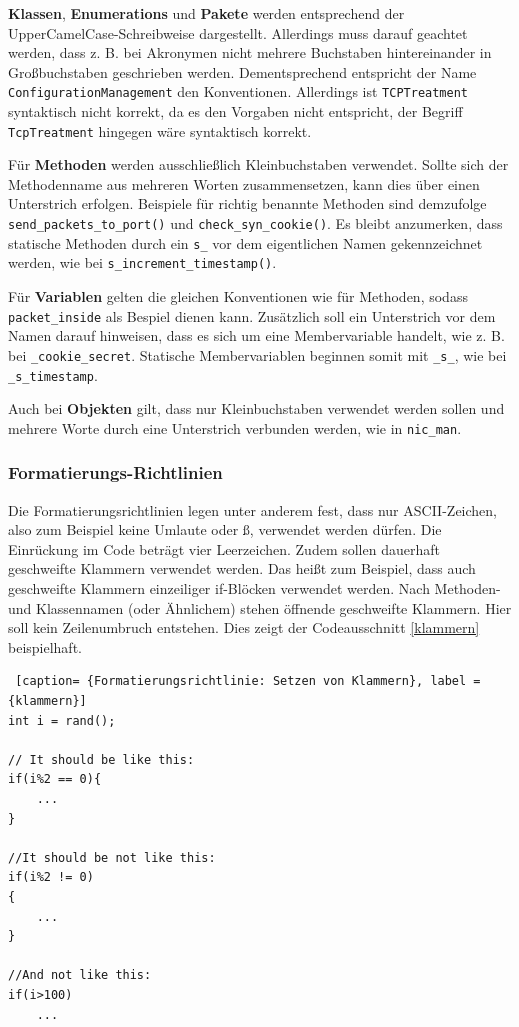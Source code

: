 \documentclass[../review_3.tex]{subfiles}
\begin{document}
\textbf{Klassen}, \textbf{Enumerations} und \textbf{Pakete} werden entsprechend der UpperCamelCase-Schreibweise dargestellt. Allerdings muss darauf geachtet werden, dass z. B. bei Akronymen nicht mehrere Buchstaben hintereinander in Großbuchstaben geschrieben werden.
Dementsprechend entspricht der Name \texttt{ConfigurationManagement} den Konventionen. Allerdings ist \texttt{TCPTreatment} syntaktisch nicht korrekt, da es den Vorgaben nicht entspricht, der Begriff \texttt{TcpTreatment} hingegen wäre syntaktisch korrekt.

Für \textbf{Methoden} werden ausschließlich Kleinbuchstaben verwendet. Sollte sich der Methodenname aus mehreren Worten zusammensetzen, kann dies über einen Unterstrich erfolgen. Beispiele für richtig benannte Methoden sind demzufolge \texttt{send\_packets\_to\_port()} und \texttt{check\_syn\_cookie()}. Es bleibt anzumerken, dass statische Methoden durch ein \texttt{s\_} vor dem eigentlichen Namen gekennzeichnet werden, wie bei \texttt{s\_increment\_timestamp()}.

Für \textbf{Variablen} gelten die gleichen Konventionen wie für Methoden, sodass \texttt{packet\_inside} als Bespiel dienen kann. Zusätzlich soll ein Unterstrich vor dem Namen darauf hinweisen, dass es sich um eine Membervariable handelt, wie z. B. bei \texttt{\_cookie\_secret}. Statische Membervariablen beginnen somit mit \texttt{\_s\_}, wie bei \texttt{\_s\_timestamp}.

Auch bei \textbf{Objekten} gilt, dass nur Kleinbuchstaben verwendet werden sollen und mehrere Worte durch eine Unterstrich verbunden werden, wie in \texttt{nic\_man}.

\subsubsection{Formatierungs-Richtlinien}
Die Formatierungsrichtlinien legen unter anderem fest, dass nur ASCII-Zeichen, also zum Beispiel keine Umlaute oder ß, verwendet werden dürfen. Die Einrückung im Code beträgt vier Leerzeichen. Zudem sollen \glqq dauerhaft\grqq{} geschweifte Klammern verwendet werden. Das heißt zum Beispiel, dass auch geschweifte Klammern einzeiliger if-Blöcken verwendet werden. Nach Methoden- und Klassennamen (oder Ähnlichem) stehen öffnende geschweifte Klammern. Hier soll kein Zeilenumbruch entstehen. Dies zeigt der Codeausschnitt \ref{klammern} beispielhaft.
\begin{lstlisting} [caption= {Formatierungsrichtlinie: Setzen von Klammern}, label = {klammern}]
int i = rand();
         
// It should be like this:
if(i%2 == 0){
    ...
}
         
//It should be not like this:
if(i%2 != 0)
{
    ...
}

//And not like this:
if(i>100)
    ...\end{lstlisting}
\end{document}
